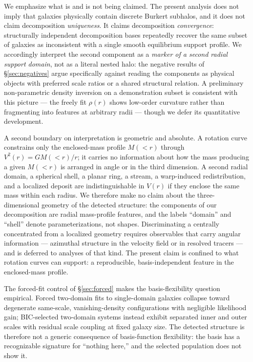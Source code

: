 \documentclass[twocolumn]{aastex631}
\begin{document}
We emphasize what is and is not being claimed. The present analysis does not
imply that galaxies physically contain discrete Burkert subhalos, and it does
not claim decomposition \emph{uniqueness}. It claims decomposition
\emph{convergence}: structurally independent decomposition bases repeatedly
recover the same subset of galaxies as inconsistent with a single smooth
equilibrium support profile. We accordingly interpret the second component as
a \emph{marker of a second radial support domain}, not as a literal nested
halo: the negative results of \S\ref{sec:negatives} argue specifically
against reading the components as physical objects with preferred scale
ratios or a shared structural relation. A preliminary non-parametric density
inversion on a demonstration subset is consistent with this picture --- the
freely fit $\rho(r)$ shows low-order curvature rather than fragmenting into
features at arbitrary radii --- though we defer its quantitative development.

A second boundary on interpretation is geometric and absolute. A rotation curve
constrains only the enclosed-mass profile $M({<}r)$ through $V^2(r) = G
M({<}r)/r$; it carries no information about how the mass producing a given
$M({<}r)$ is arranged in angle or in the third dimension. A second radial domain,
a spherical shell, a planar ring, a stream, a warp-induced redistribution, and a
localized deposit are indistinguishable in $V(r)$ if they enclose the same mass
within each radius. We therefore make no claim about the three-dimensional
geometry of the detected structure: the components of our decomposition are
radial mass-profile features, and the labels ``domain'' and ``shell'' denote
parameterizations, not shapes. Discriminating a centrally concentrated from a
localized geometry requires observables that carry angular information ---
azimuthal structure in the velocity field or in resolved tracers --- and is
deferred to analyses of that kind. The present claim is confined to what
rotation curves can support: a reproducible, basis-independent feature in the
enclosed-mass profile.

The forced-fit control of \S\ref{sec:forced} makes the basis-flexibility
question empirical. Forced two-domain fits to single-domain galaxies collapse
toward degenerate same-scale, vanishing-density configurations with
negligible likelihood gain; BIC-selected two-domain systems instead exhibit
separated inner and outer scales with residual scale coupling at fixed galaxy
size. The detected structure is therefore not a generic consequence of
basis-function flexibility: the basis has a recognizable signature for
``nothing here,'' and the selected population does not show it.
\end{document}
